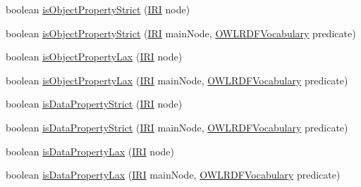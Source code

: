 \begin{DoxyCompactItemize}
\item 
boolean \hyperlink{classorg_1_1coode_1_1owlapi_1_1rdfxml_1_1parser_1_1_abstract_class_expression_translator_afc227fd244dd7d5f89ba64d500002f11}{is\-Object\-Property\-Strict} (\hyperlink{classorg_1_1semanticweb_1_1owlapi_1_1model_1_1_i_r_i}{I\-R\-I} node)
\item 
boolean \hyperlink{classorg_1_1coode_1_1owlapi_1_1rdfxml_1_1parser_1_1_abstract_class_expression_translator_aec1acfe3ef95110f1904d82147a40c99}{is\-Object\-Property\-Strict} (\hyperlink{classorg_1_1semanticweb_1_1owlapi_1_1model_1_1_i_r_i}{I\-R\-I} main\-Node, \hyperlink{enumorg_1_1semanticweb_1_1owlapi_1_1vocab_1_1_o_w_l_r_d_f_vocabulary}{O\-W\-L\-R\-D\-F\-Vocabulary} predicate)
\item 
boolean \hyperlink{classorg_1_1coode_1_1owlapi_1_1rdfxml_1_1parser_1_1_abstract_class_expression_translator_a2180fda16de4044abb8fa6d95e04a87c}{is\-Object\-Property\-Lax} (\hyperlink{classorg_1_1semanticweb_1_1owlapi_1_1model_1_1_i_r_i}{I\-R\-I} node)
\item 
boolean \hyperlink{classorg_1_1coode_1_1owlapi_1_1rdfxml_1_1parser_1_1_abstract_class_expression_translator_a154120202cb68532436e205885dc74c4}{is\-Object\-Property\-Lax} (\hyperlink{classorg_1_1semanticweb_1_1owlapi_1_1model_1_1_i_r_i}{I\-R\-I} main\-Node, \hyperlink{enumorg_1_1semanticweb_1_1owlapi_1_1vocab_1_1_o_w_l_r_d_f_vocabulary}{O\-W\-L\-R\-D\-F\-Vocabulary} predicate)
\item 
boolean \hyperlink{classorg_1_1coode_1_1owlapi_1_1rdfxml_1_1parser_1_1_abstract_class_expression_translator_a9f57d2c69155e47e15a50ee4e248eff3}{is\-Data\-Property\-Strict} (\hyperlink{classorg_1_1semanticweb_1_1owlapi_1_1model_1_1_i_r_i}{I\-R\-I} node)
\item 
boolean \hyperlink{classorg_1_1coode_1_1owlapi_1_1rdfxml_1_1parser_1_1_abstract_class_expression_translator_ab3a014281471506c1fbe0825f957c113}{is\-Data\-Property\-Strict} (\hyperlink{classorg_1_1semanticweb_1_1owlapi_1_1model_1_1_i_r_i}{I\-R\-I} main\-Node, \hyperlink{enumorg_1_1semanticweb_1_1owlapi_1_1vocab_1_1_o_w_l_r_d_f_vocabulary}{O\-W\-L\-R\-D\-F\-Vocabulary} predicate)
\item 
boolean \hyperlink{classorg_1_1coode_1_1owlapi_1_1rdfxml_1_1parser_1_1_abstract_class_expression_translator_a569340aee0e43ecf03e0285a92543db3}{is\-Data\-Property\-Lax} (\hyperlink{classorg_1_1semanticweb_1_1owlapi_1_1model_1_1_i_r_i}{I\-R\-I} node)
\item 
boolean \hyperlink{classorg_1_1coode_1_1owlapi_1_1rdfxml_1_1parser_1_1_abstract_class_expression_translator_a3524f3f517b42b07dcd386cf2bb0c6c2}{is\-Data\-Property\-Lax} (\hyperlink{classorg_1_1semanticweb_1_1owlapi_1_1model_1_1_i_r_i}{I\-R\-I} main\-Node, \hyperlink{enumorg_1_1semanticweb_1_1owlapi_1_1vocab_1_1_o_w_l_r_d_f_vocabulary}{O\-W\-L\-R\-D\-F\-Vocabulary} predicate)

\end{DoxyCompactItemize}
